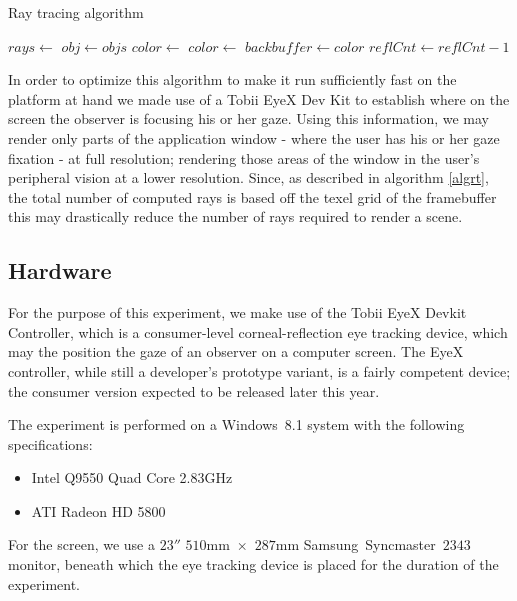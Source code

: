 \begin{algorithm}
\begin{algorithmic}[1]
\caption{Ray tracing algorithm}\label{algrt}
\State $rays\gets$
    \State $obj\gets objs$
\EndIf
\State $color\gets$
\State $color\gets$
\EndFor
\State $backbuffer\gets color$
\EndFor
\State $reflCnt\gets reflCnt - 1$
\EndWhile
\EndProcedure
\end{algorithmic}
\end{algorithm}

In order to optimize this algorithm to make it run sufficiently fast on the platform at hand we made use of a Tobii EyeX Dev Kit to establish where on the screen the observer is focusing his or her gaze.
Using this information, we may render only parts of the application window - where the user has his or her gaze fixation - at full resolution; rendering those areas of the window in the user's peripheral vision at a lower resolution.
Since, as described in algorithm \ref{algrt}, the total number of computed rays is based off the texel grid of the framebuffer this may drastically reduce the number of rays required to render a scene.

\subsection{Hardware}
For the purpose of this experiment, we make use of the Tobii EyeX Devkit Controller, which is a consumer-level corneal-reflection eye tracking device, which may the position the gaze of an observer on a computer screen.
The EyeX controller, while still a developer's prototype variant, is a fairly competent device; the consumer version expected to be released later this year.

The experiment is performed on a Windows~8.1 system with the following specifications:
\begin{itemize}
\setlength\itemsep{0em}
\item Intel Q9550 Quad Core 2.83GHz
\item ATI Radeon HD 5800
\end{itemize}

For the screen, we use a $23''$ $510$mm~$\times$~$287$mm Samsung~Syncmaster~$2343$ monitor, beneath which the eye tracking device is placed for the duration of the experiment.

